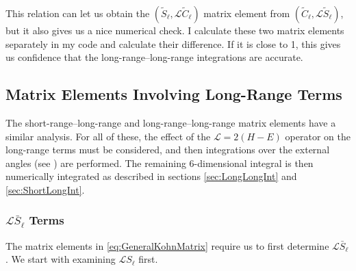 \documentclass[Dissertation.tex]{subfiles}
\begin{document}
This relation can let us obtain the $(\widetilde{S}_\ell,\mathcal{L}\widetilde{C}_\ell)$ matrix element from $(\widetilde{C}_\ell,\mathcal{L}\widetilde{S}_\ell)$, but it also gives us a nice numerical check. I calculate these two matrix elements separately in my code and calculate their difference. If it is close to 1, this gives us confidence that the long-range--long-range integrations are accurate.


\subsection{Matrix Elements Involving Long-Range Terms}
\label{sec:MatrixLong}
The short-range--long-range and long-range--long-range matrix elements have a similar analysis. For all of these, the effect of the $\mathcal{L} = 2(H-E)$ operator on the long-range terms must be considered, and then integrations over the external angles (see ) are performed. The remaining 6-dimensional integral is then numerically integrated as described in sections \ref{sec:LongLongInt} and \ref{sec:ShortLongInt}.

\subsubsection{\texorpdfstring{$\mathcal{L}\bar{S}_\ell$}{LS} Terms}
\label{sec:LSTerms}
The matrix elements in \cref{eq:GeneralKohnMatrix} require us to first determine $\mathcal{L}\bar{S}_\ell$. We start with examining $\mathcal{L}S_\ell$ first.
\end{document}

